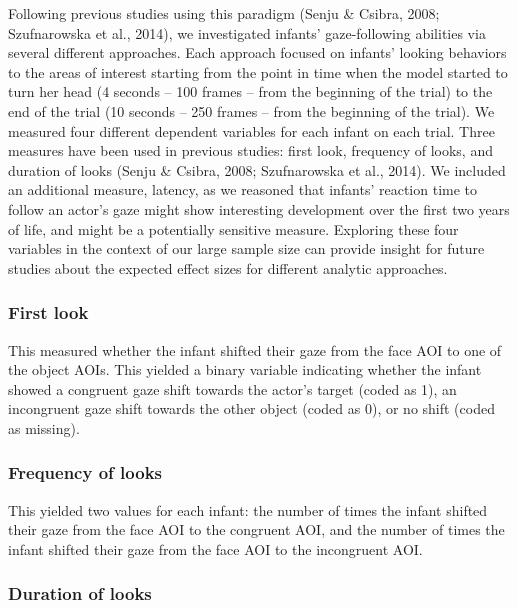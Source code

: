 \documentclass[,man,floatsintext]{apa6}
\begin{document}
Following previous studies using this paradigm (Senju \& Csibra, 2008; Szufnarowska et al., 2014), we investigated infants' gaze-following abilities via several different approaches. Each approach focused on infants' looking behaviors to the areas of interest starting from the point in time when the model started to turn her head (4 seconds -- 100 frames -- from the beginning of the trial) to the end of the trial (10 seconds -- 250 frames -- from the beginning of the trial). We measured four different dependent variables for each infant on each trial. Three measures have been used in previous studies: first look, frequency of looks, and duration of looks (Senju \& Csibra, 2008; Szufnarowska et al., 2014). We included an additional measure, latency, as we reasoned that infants' reaction time to follow an actor's gaze might show interesting development over the first two years of life, and might be a potentially sensitive measure. Exploring these four variables in the context of our large sample size can provide insight for future studies about the expected effect sizes for different analytic approaches.

\hypertarget{first-look}{%
\subsubsection{First look}\label{first-look}}

This measured whether the infant shifted their gaze from the face AOI to one of the object AOIs. This yielded a binary variable indicating whether the infant showed a congruent gaze shift towards the actor's target (coded as 1), an incongruent gaze shift towards the other object (coded as 0), or no shift (coded as missing).

\hypertarget{frequency-of-looks}{%
\subsubsection{Frequency of looks}\label{frequency-of-looks}}

This yielded two values for each infant: the number of times the infant shifted their gaze from the face AOI to the congruent AOI, and the number of times the infant shifted their gaze from the face AOI to the incongruent AOI.

\hypertarget{duration-of-looks}{%
\subsubsection{Duration of looks}\label{duration-of-looks}}
\end{document}
